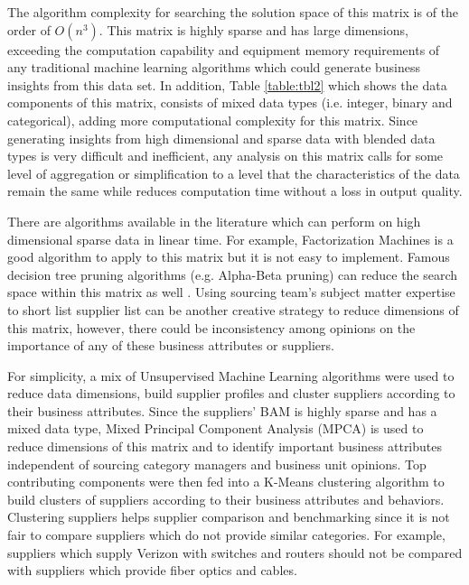 \documentclass[inte,nonblindrev]{informs3} %
\begin{document}
The algorithm complexity for searching the solution space of this matrix is of the order of $O(n^{3})$. This matrix is highly sparse and has large dimensions, exceeding the computation capability and equipment memory requirements of any traditional machine learning algorithms which could generate business insights from this data set. In addition, Table \ref{table:tbl2} which shows the data components of this matrix, consists of mixed data types (i.e. integer, binary and categorical), adding more computational complexity for this matrix. Since generating insights from high dimensional and sparse data with blended data types is very difficult and inefficient, any analysis on this matrix calls for some level of aggregation or simplification to a level that the characteristics of the data remain the same \citep{r11} while reduces computation time without a loss in output quality.

There are algorithms available in the literature which can perform on high dimensional sparse data in linear time. For example, Factorization Machines \citep{r8} is a good algorithm to apply to this matrix but it is not easy to implement. Famous decision tree pruning algorithms (e.g. Alpha-Beta pruning) can reduce the search space within this matrix as well \citep{r9}. Using sourcing team's subject matter expertise to short list supplier list can be another creative strategy to reduce dimensions of this matrix, however, there could be inconsistency among opinions on the importance of any of these business attributes or suppliers. 

For simplicity, a mix of Unsupervised Machine Learning algorithms were used to reduce data dimensions, build supplier profiles and cluster suppliers according to their business attributes. Since the suppliers' BAM is highly sparse and has a mixed data type, Mixed Principal Component Analysis (MPCA) \citep{r1} is used to reduce dimensions of this matrix and to identify important business attributes independent of sourcing category managers and business unit opinions. Top contributing components were then fed into a K-Means \citep{r2} clustering algorithm to build clusters of suppliers according to their business attributes and behaviors. Clustering suppliers helps supplier comparison and benchmarking since it is not fair to compare suppliers which do not provide similar categories. For example, suppliers which supply Verizon with switches and routers should not be compared with suppliers which provide fiber optics and cables. 
\end{document}
